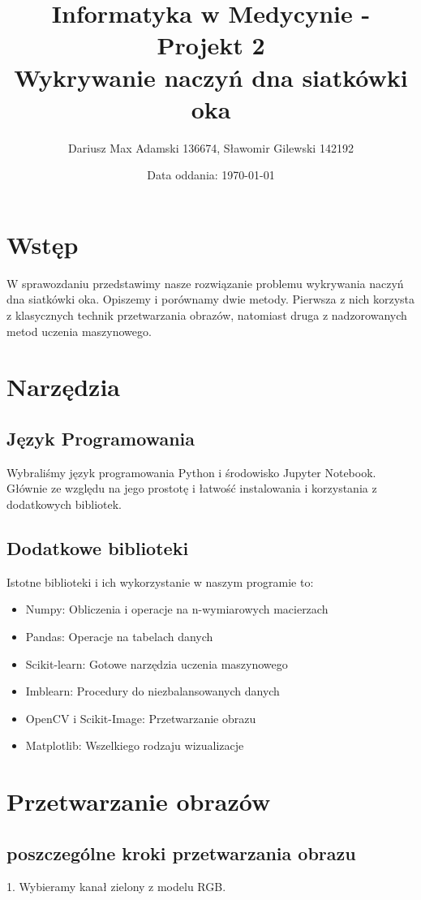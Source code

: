 \documentclass[11pt]{article}
\title{Informatyka w Medycynie - Projekt 2\\ Wykrywanie naczyń dna siatkówki oka}
\author{Dariusz Max Adamski 136674, Sławomir Gilewski 142192}
\affil{\{dariusz.adamski,slawomir.gilewski\}@student.put.poznan.pl}
\date{Data oddania: \today}
\begin{document}
\maketitle

\section*{Wstęp}

W sprawozdaniu przedstawimy nasze rozwiązanie problemu wykrywania naczyń dna siatkówki oka.
Opiszemy i porównamy dwie metody. Pierwsza z nich korzysta z klasycznych technik przetwarzania obrazów,
natomiast druga z nadzorowanych metod uczenia maszynowego.

\section{Narzędzia}

\subsection{Język Programowania}
Wybraliśmy język programowania Python i środowisko Jupyter Notebook. Głównie ze względu na jego prostotę i łatwość instalowania i korzystania z dodatkowych bibliotek.

\subsection{Dodatkowe biblioteki}
Istotne biblioteki i ich wykorzystanie w naszym programie to:
\begin{itemize}
    \item Numpy: Obliczenia i operacje na n-wymiarowych macierzach
    \item Pandas: Operacje na tabelach danych
    \item Scikit-learn: Gotowe narzędzia uczenia maszynowego
    \item Imblearn: Procedury do niezbalansowanych danych
    \item OpenCV i Scikit-Image: Przetwarzanie obrazu
    \item Matplotlib: Wszelkiego rodzaju wizualizacje
\end{itemize}

\section{Przetwarzanie obrazów}
\subsection{poszczególne kroki przetwarzania obrazu}
1. Wybieramy kanał zielony z modelu RGB.
\end{document}
